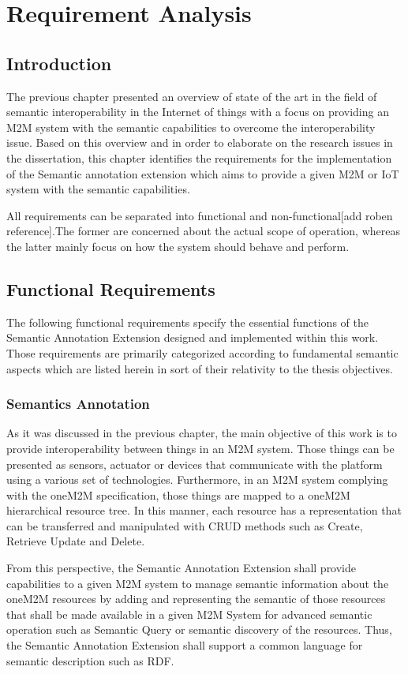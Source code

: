\cleardoublepage
\chapter{Requirement Analysis}\label{sec:reqs}\minitoc\vspace{.5cm}

\section{Introduction}

The previous chapter presented an overview of state of the art in the field of semantic interoperability in the Internet of things with a focus on providing an M2M system with the semantic capabilities to overcome the interoperability issue. Based on this overview and in order to elaborate on the research issues in the dissertation, this chapter identifies the requirements for the implementation of the Semantic annotation extension which aims to provide a given M2M or IoT system with the semantic capabilities. \par 
All requirements can be separated into functional and non-functional[add roben reference].The former are concerned about the actual scope of operation, whereas the latter mainly focus on how the system should behave and perform.

\section{Functional Requirements}
The following functional requirements specify the essential functions of the Semantic Annotation Extension designed and implemented within this work. Those requirements are primarily categorized according to fundamental semantic aspects which are listed herein in sort of their relativity to the thesis objectives. 

\subsection{Semantics Annotation}
As it was discussed in the previous chapter, the main objective of this work is to provide interoperability between things in an M2M system. Those things can be presented as sensors, actuator or devices that communicate with the platform using a various set of technologies. Furthermore, in an M2M system complying with the oneM2M specification, those things are mapped to a oneM2M hierarchical resource tree. In this manner, each resource has a representation that can be transferred and manipulated with CRUD methods such as Create, Retrieve Update and Delete. \par 
From this perspective, the Semantic Annotation Extension shall provide capabilities to a given M2M system to manage semantic information about the oneM2M resources by adding and representing the semantic of those resources that shall be made available in a given M2M System for advanced semantic operation such as Semantic Query or semantic discovery of the resources. Thus, the Semantic Annotation Extension shall support a common language for semantic description such as RDF. 

